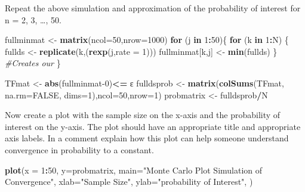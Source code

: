 \documentclass[
]{article}
\newenvironment{Shaded}{\begin{snugshade}}{\end{snugshade}}
\newcommand{\CommentTok}[1]{\textcolor[rgb]{0.56,0.35,0.01}{\textit{#1}}}
\newcommand{\ControlFlowTok}[1]{\textcolor[rgb]{0.13,0.29,0.53}{\textbf{#1}}}
\newcommand{\DataTypeTok}[1]{\textcolor[rgb]{0.13,0.29,0.53}{#1}}
\newcommand{\DecValTok}[1]{\textcolor[rgb]{0.00,0.00,0.81}{#1}}
\newcommand{\KeywordTok}[1]{\textcolor[rgb]{0.13,0.29,0.53}{\textbf{#1}}}
\newcommand{\NormalTok}[1]{#1}
\newcommand{\OperatorTok}[1]{\textcolor[rgb]{0.81,0.36,0.00}{\textbf{#1}}}
\newcommand{\OtherTok}[1]{\textcolor[rgb]{0.56,0.35,0.01}{#1}}
\newcommand{\StringTok}[1]{\textcolor[rgb]{0.31,0.60,0.02}{#1}}
\begin{document}
Repeat the above simulation and approximation of the probability of
interest for n = 2, 3, \ldots, 50.

\begin{Shaded}
\begin{Highlighting}[]
\NormalTok{fullminmat <-}\StringTok{ }\KeywordTok{matrix}\NormalTok{(}\DataTypeTok{ncol=}\DecValTok{50}\NormalTok{,}\DataTypeTok{nrow=}\DecValTok{1000}\NormalTok{)}
\ControlFlowTok{for}\NormalTok{ (j }\ControlFlowTok{in} \DecValTok{1}\OperatorTok{:}\DecValTok{50}\NormalTok{)\{}
  \ControlFlowTok{for}\NormalTok{ (k }\ControlFlowTok{in} \DecValTok{1}\OperatorTok{:}\NormalTok{N) \{}
\NormalTok{  fullds <-}\StringTok{ }\KeywordTok{replicate}\NormalTok{(k,(}\KeywordTok{rexp}\NormalTok{(j,}\DataTypeTok{rate =} \DecValTok{1}\NormalTok{)))}
\NormalTok{  fullminmat[k,j] <-}\StringTok{ }\KeywordTok{min}\NormalTok{(fullds) \} }\CommentTok{#Creates our }
\NormalTok{\}}

\NormalTok{TFmat <-}\StringTok{ }\KeywordTok{abs}\NormalTok{(fullminmat}\DecValTok{-0}\NormalTok{)}\OperatorTok{<=}\StringTok{ }\NormalTok{ε}
\NormalTok{fulldsprob <-}\StringTok{ }\KeywordTok{matrix}\NormalTok{(}\KeywordTok{colSums}\NormalTok{(TFmat, }\DataTypeTok{na.rm=}\OtherTok{FALSE}\NormalTok{, }\DataTypeTok{dims=}\DecValTok{1}\NormalTok{),}\DataTypeTok{ncol=}\DecValTok{50}\NormalTok{,}\DataTypeTok{nrow=}\DecValTok{1}\NormalTok{)}
\NormalTok{probmatrix <-}\StringTok{ }\NormalTok{fulldsprob}\OperatorTok{/}\NormalTok{N}
\end{Highlighting}
\end{Shaded}

Now create a plot with the sample size on the x-axis and the probability
of interest on the y-axis. The plot should have an appropriate title and
appropriate axis labels. In a comment explain how this plot can help
someone understand convergence in probability to a constant.

\begin{Shaded}
\begin{Highlighting}[]
\KeywordTok{plot}\NormalTok{(}\DataTypeTok{x =} \DecValTok{1}\OperatorTok{:}\DecValTok{50}\NormalTok{,}
     \DataTypeTok{y=}\NormalTok{probmatrix,}
     \DataTypeTok{main=}\StringTok{"Monte Carlo Plot Simulation of Convergence"}\NormalTok{, }
     \DataTypeTok{xlab=}\StringTok{"Sample Size"}\NormalTok{, }
     \DataTypeTok{ylab=}\StringTok{"probability of Interest"}\NormalTok{, }
\NormalTok{     )}
\end{Highlighting}
\end{Shaded}
\end{document}

